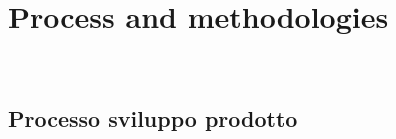 \chapter{Process and methodologies}
\label{cap:process-methodologies}

\\

\section{Processo sviluppo prodotto}
